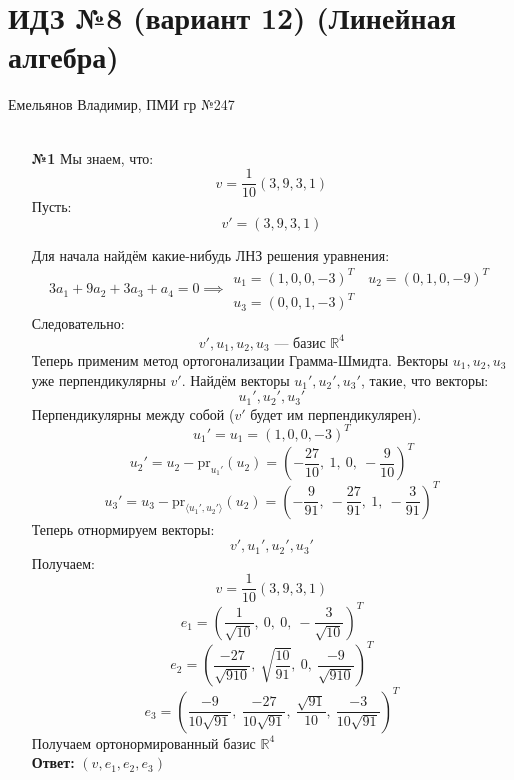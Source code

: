 \documentclass[a4paper]{article}
\renewcommand{\f}[2]{\frac{#1}{#2}}
\newcommand{\RR}{\mathbb{R}}
\begin{document}
\section*{ИДЗ №8 (вариант 12) (Линейная алгебра)}
 {\large Емельянов Владимир, ПМИ гр №247}\\\\
\begin{enumerate}
    \item[\textbf{№1}]Мы знаем, что:
    $$v = \f{1}{10}(3, 9, 3, 1)$$
    Пусть:
    $$v' = (3, 9, 3, 1)$$
    
    Для начала найдём какие-нибудь ЛНЗ решения уравнения:
    $$3a_1 + 9a_2 + 3a_3 + a_4 = 0 \implies \begin{aligned}
        u_1 = (1, 0, 0, -3)^T \quad u_2 = (0, 1, 0, -9)^T\\
        u_3 = (0, 0, 1, -3)^T
    \end{aligned}$$
    Следовательно:
    $$v', u_1, u_2, u_3 \text{ --- базис $\RR^4$}$$
    Теперь применим метод ортогонализации Грамма-Шмидта. 
    Векторы $u_1, u_2, u_3$ уже перпендикулярны $v'$. Найдём векторы $u_1', u_2', u_3'$, такие, что векторы:
    $$u_1', u_2', u_3'$$
    Перпендикулярны между собой ($v'$ будет им перпендикулярен).
    $$u_1' = u_1 = (1, 0, 0, -3)^T$$
    $$u_2' = u_2 - \text{pr}_{u_1'}(u_2) = \left(-\frac{27}{10},\ 1,\ 0,\ -\frac{9}{10}\right)^T$$
    $$u_3' = u_3 - \text{pr}_{\langle u_1', u_2' \rangle}(u_2) =  \left( -\frac{9}{91},\ -\frac{27}{91},\ 1,\ -\frac{3}{91} \right)^T$$
    Теперь отнормируем векторы:
    $$v', u_1', u_2', u_3'$$
    Получаем:
    $$v = \f{1}{10}(3, 9, 3, 1)$$
    $$e_1 = \left( \frac{1}{\sqrt{10}},\ 0,\ 0,\ -\frac{3}{\sqrt{10}} \right)^T$$
    $$e_2 =  \left( \frac{-27}{\sqrt{910}},\ \sqrt{\frac{10}{91}},\ 0,\ \frac{-9}{\sqrt{910}} \right)^T$$
    $$e_3 = \left( \frac{-9}{10\sqrt{91}},\ \frac{-27}{10\sqrt{91}},\ \frac{\sqrt{91}}{10},\ \frac{-3}{10\sqrt{91}} \right)^T$$
    Получаем ортонормированный базис $\RR^4$\\
    \textbf{Ответ: } $(v, e_1, e_2, e_3)$\\
\end{enumerate}
\end{document}
